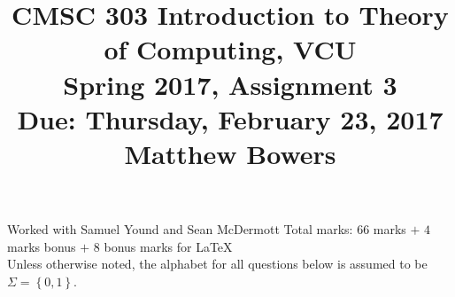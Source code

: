 \documentclass{article}
\newcommand{\set}[1]{{\left\{#1\right\}}}    %
\begin{document}
\title{CMSC 303 Introduction to Theory of Computing, VCU\\Spring 2017, Assignment 3\\Due: Thursday, February 23, 2017\\Matthew Bowers}
\date{}
\maketitle
\noindent Worked with Samuel Yound and Sean McDermott
\noindent Total marks: $66$ marks $+$ $4$ marks bonus $+$ $8$ bonus marks for LaTeX\\

\noindent Unless otherwise noted, the alphabet for all questions below is assumed to be $\Sigma=\set{0,1}$.
\end{document}
